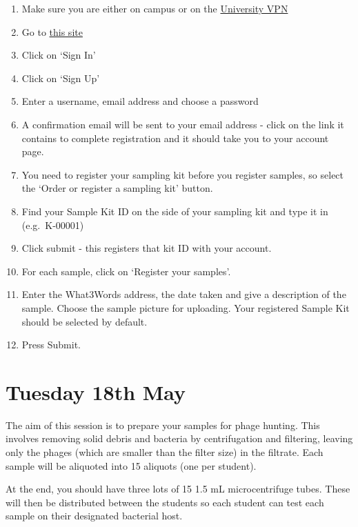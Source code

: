 \documentclass[
]{book}
\providecommand{\tightlist}{%
  \setlength{\itemsep}{0pt}\setlength{\parskip}{0pt}}
\begin{document}
\begin{enumerate}
\def\labelenumi{\arabic{enumi}.}
\tightlist
\item
  Make sure you are either on campus or on the \href{https://www.exeter.ac.uk/it/howdoi/vpn/}{University VPN}
\item
  Go to \href{http://144.173.115.131/}{this site}
\item
  Click on `Sign In'
\item
  Click on `Sign Up'
\item
  Enter a username, email address and choose a password
\item
  A confirmation email will be sent to your email address - click on the link it contains to complete registration and it should take you to your account page.
\item
  You need to register your sampling kit before you register samples, so select the `Order or register a sampling kit' button.
\item
  Find your Sample Kit ID on the side of your sampling kit and type it in (e.g.~K-00001)
\item
  Click submit - this registers that kit ID with your account.
\item
  For each sample, click on `Register your samples'.
\item
  Enter the What3Words address, the date taken and give a description of the sample. Choose the sample picture for uploading. Your registered Sample Kit should be selected by default.
\item
  Press Submit.
\end{enumerate}

\hypertarget{tuesday-18th-may}{%
\section{Tuesday 18th May}\label{tuesday-18th-may}}

The aim of this session is to prepare your samples for phage hunting. This involves removing solid debris and bacteria by centrifugation and filtering, leaving only the phages (which are smaller than the filter size) in the filtrate. Each sample will be aliquoted into 15 aliquots (one per student).

At the end, you should have three lots of 15 1.5 mL microcentrifuge tubes. These will then be distributed between the students so each student can test each sample on their designated bacterial host.
\end{document}
